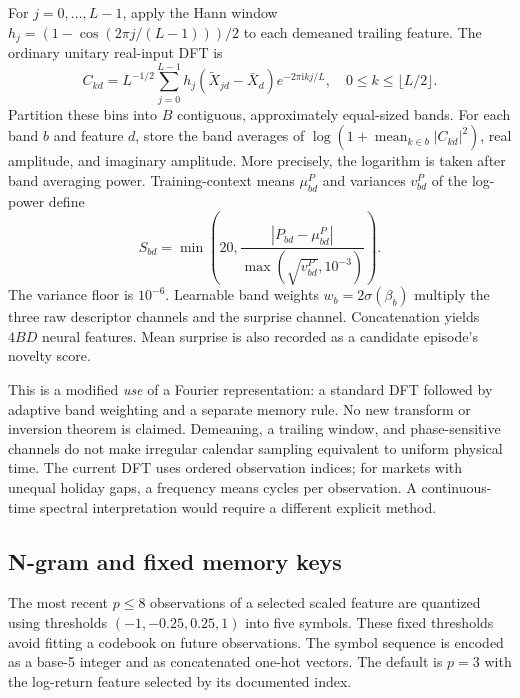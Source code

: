 \documentclass[11pt,a4paper]{article}
\begin{document}
For $j=0,\ldots,L-1$, apply the Hann window $h_j=(1-\cos(2\pi j/(L-1)))/2$ to each demeaned trailing feature. The ordinary unitary real-input DFT is
\begin{equation}
C_{kd}=L^{-1/2}\sum_{j=0}^{L-1}h_j(\widetilde X_{jd}-\bar X_d)e^{-2\pi\mathrm{i}kj/L},\quad 0\le k\le\lfloor L/2\rfloor.
\end{equation}
Partition these bins into $B$ contiguous, approximately equal-sized bands. For each band $b$ and feature $d$, store the band averages of $\log(1+\operatorname{mean}_{k\in b}|C_{kd}|^2)$, real amplitude, and imaginary amplitude. More precisely, the logarithm is taken after band averaging power. Training-context means $\mu^P_{bd}$ and variances $v^P_{bd}$ of the log-power define
\begin{equation}
S_{bd}=\min\!\left(20,\frac{|P_{bd}-\mu^P_{bd}|}{\max(\sqrt{v^P_{bd}},10^{-3})}\right).
\end{equation}
The variance floor is $10^{-6}$. Learnable band weights $w_b=2\sigma(\beta_b)$ multiply the three raw descriptor channels and the surprise channel. Concatenation yields $4BD$ neural features. Mean surprise is also recorded as a candidate episode's novelty score.

This is a modified \emph{use} of a Fourier representation: a standard DFT followed by adaptive band weighting and a separate memory rule. No new transform or inversion theorem is claimed. Demeaning, a trailing window, and phase-sensitive channels do not make irregular calendar sampling equivalent to uniform physical time. The current DFT uses ordered observation indices; for markets with unequal holiday gaps, a frequency means cycles per observation. A continuous-time spectral interpretation would require a different explicit method.

\subsection{N-gram and fixed memory keys}

The most recent $p\le8$ observations of a selected scaled feature are quantized using thresholds $(-1,-0.25,0.25,1)$ into five symbols. These fixed thresholds avoid fitting a codebook on future observations. The symbol sequence is encoded as a base-5 integer and as concatenated one-hot vectors. The default is $p=3$ with the log-return feature selected by its documented index.
\end{document}
